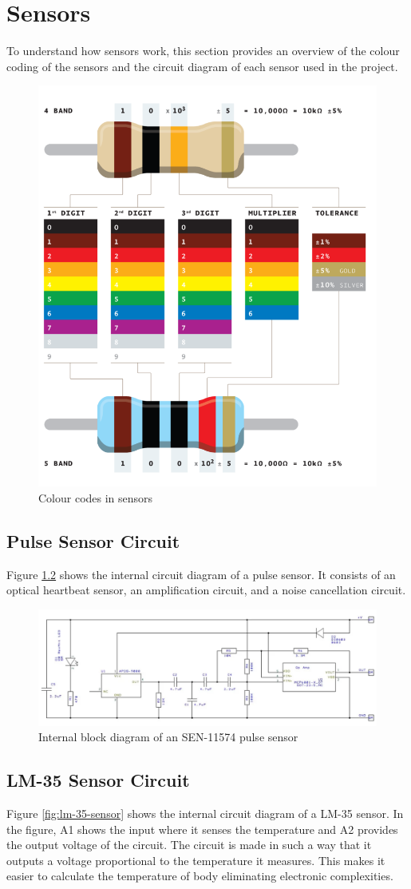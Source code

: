 \chapter{Sensors}
To understand how sensors work, this section provides an overview of the colour coding of the sensors and the circuit diagram of each sensor used in the project.

\begin{figure}
    \centering
    \includegraphics[width=0.5\linewidth]{images/sensors-color-code.png}
    \caption{ Colour codes in sensors \cite{36}}
    \label{fig:sensors-color-code}
\end{figure}

\section{Pulse Sensor Circuit}
Figure \ref{fig:pulse-sensor} shows the internal circuit diagram of a pulse sensor. It consists of an optical heartbeat sensor, an amplification circuit, and a noise cancellation circuit.

\begin{figure}
    \centering
    \includegraphics[width=0.75\linewidth]{images/image.png}
    \caption{Internal block diagram of an SEN-11574 pulse sensor \cite{37}}
    \label{fig:pulse-sensor}
\end{figure}

\section{LM-35 Sensor Circuit}
Figure \ref{fig:lm-35-sensor} shows the internal circuit diagram of a LM-35 sensor. In the figure, A1 shows the input where it senses the temperature and A2 provides the output voltage of the circuit. The circuit is made in such a way that it outputs a voltage proportional to the temperature it measures. This makes it easier to calculate the temperature of body eliminating electronic complexities. 

